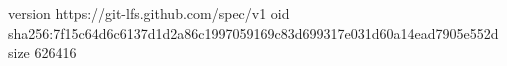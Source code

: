 version https://git-lfs.github.com/spec/v1
oid sha256:7f15c64d6c6137d1d2a86c1997059169c83d699317e031d60a14ead7905e552d
size 626416
